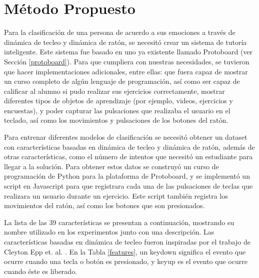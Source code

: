 
\chapter{Método Propuesto}

Para la clasificación de una persona de acuerdo a sus emociones a
través de dinámica de tecleo y dinámica de ratón, se necesitó crear un
sistema de tutoría inteligente. Este sistema fue basado en uno ya
existente llamado Protoboard (ver Sección \ref{protoboard}). Para que
cumpliera con nuestras necesidades, se tuvieron que hacer
implementaciones adicionales, entre ellas: que fuera capaz de mostrar un curso
completo de algún lenguaje de programación, así como ser capaz de
calificar al alumno si pudo realizar sus ejercicios correctamente,
mostrar diferentes tipos de objetos de aprendizaje (por ejemplo, videos,
ejercicios y encuestas), y poder capturar las pulsaciones que
realizaba el usuario en el teclado, así como los movimientos y
pulsaciones de los botones del ratón.

Para entrenar diferentes modelos de clasificación se necesitó obtener
un dataset con características basadas en dinámica de tecleo y
dinámica de ratón, además de otras características, como el número de
intentos que necesitó un estudiante para llegar a la solución. Para
obtener estos datos se construyó un curso de programación de Python
para la plataforma de Protoboard, y se implementó un script en
Javascript para que registrara cada una de las pulsaciones de teclas
que realizara un usuario durante un ejercicio. Este script también
registra los movimientos del ratón, así como los botones que son
presionados.

La lista de las 39 características se presentan a continuación,
mostrando su nombre utilizado en los experimentos junto con una
descripción. Las características basadas en dinámica de tecleo fueron
inspiradas por el trabajo de Cleyton Epp
et. al. \cite{epp2011identifying}. En la Tabla \ref{features}, un
keydown significa el evento que ocurre cuando una tecla o botón es
presionado, y keyup es el evento que ocurre cuando éste es liberado.


